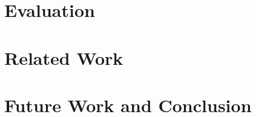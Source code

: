 \documentclass[12pt]{article}
\begin{document}
\section*{Evaluation}


\section*{Related Work}


\section*{Future Work and Conclusion}




\end{document}
